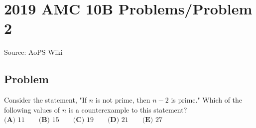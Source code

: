\documentclass[12pt]{article}
\begin{document}
\section*{{2019 AMC 10B Problems/Problem 2}}
Source: AoPS Wiki

\subsection*{Problem}
Consider the statement, "If $n$ is not prime, then $n-2$ is prime." Which of the following values of $n$ is a counterexample to this statement? $\textbf{(A) } 11 \qquad \textbf{(B) } 15 \qquad \textbf{(C) } 19 \qquad \textbf{(D) } 21 \qquad \textbf{(E) } 27$
\end{document}
